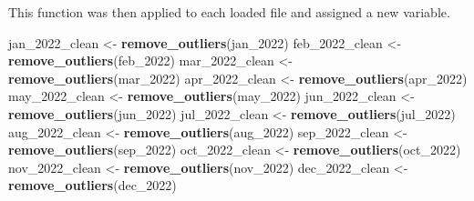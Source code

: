 \documentclass[
]{article}
\newenvironment{Shaded}{\begin{snugshade}}{\end{snugshade}}
\newcommand{\AttributeTok}[1]{\textcolor[rgb]{0.13,0.29,0.53}{#1}}
\newcommand{\ControlFlowTok}[1]{\textcolor[rgb]{0.13,0.29,0.53}{\textbf{#1}}}
\newcommand{\DecValTok}[1]{\textcolor[rgb]{0.00,0.00,0.81}{#1}}
\newcommand{\DocumentationTok}[1]{\textcolor[rgb]{0.56,0.35,0.01}{\textbf{\textit{#1}}}}
\newcommand{\FunctionTok}[1]{\textcolor[rgb]{0.13,0.29,0.53}{\textbf{#1}}}
\newcommand{\NormalTok}[1]{#1}
\newcommand{\OtherTok}[1]{\textcolor[rgb]{0.56,0.35,0.01}{#1}}
\newcommand{\SpecialCharTok}[1]{\textcolor[rgb]{0.81,0.36,0.00}{\textbf{#1}}}
\newcommand{\StringTok}[1]{\textcolor[rgb]{0.31,0.60,0.02}{#1}}
\begin{document}
\begin{Shaded}
\end{Shaded}

This function was then applied to each loaded file and assigned a new
variable.

\begin{Shaded}
\begin{Highlighting}[]
\NormalTok{jan\_2022\_clean }\OtherTok{\textless{}{-}} \FunctionTok{remove\_outliers}\NormalTok{(jan\_2022)}
\NormalTok{feb\_2022\_clean }\OtherTok{\textless{}{-}} \FunctionTok{remove\_outliers}\NormalTok{(feb\_2022)}
\NormalTok{mar\_2022\_clean }\OtherTok{\textless{}{-}} \FunctionTok{remove\_outliers}\NormalTok{(mar\_2022)}
\NormalTok{apr\_2022\_clean }\OtherTok{\textless{}{-}} \FunctionTok{remove\_outliers}\NormalTok{(apr\_2022)}
\NormalTok{may\_2022\_clean }\OtherTok{\textless{}{-}} \FunctionTok{remove\_outliers}\NormalTok{(may\_2022)}
\NormalTok{jun\_2022\_clean }\OtherTok{\textless{}{-}} \FunctionTok{remove\_outliers}\NormalTok{(jun\_2022)}
\NormalTok{jul\_2022\_clean }\OtherTok{\textless{}{-}} \FunctionTok{remove\_outliers}\NormalTok{(jul\_2022)}
\NormalTok{aug\_2022\_clean }\OtherTok{\textless{}{-}} \FunctionTok{remove\_outliers}\NormalTok{(aug\_2022)}
\NormalTok{sep\_2022\_clean }\OtherTok{\textless{}{-}} \FunctionTok{remove\_outliers}\NormalTok{(sep\_2022)}
\NormalTok{oct\_2022\_clean }\OtherTok{\textless{}{-}} \FunctionTok{remove\_outliers}\NormalTok{(oct\_2022)}
\NormalTok{nov\_2022\_clean }\OtherTok{\textless{}{-}} \FunctionTok{remove\_outliers}\NormalTok{(nov\_2022)}
\NormalTok{dec\_2022\_clean }\OtherTok{\textless{}{-}} \FunctionTok{remove\_outliers}\NormalTok{(dec\_2022)}
\end{Highlighting}
\end{Shaded}
\end{document}
